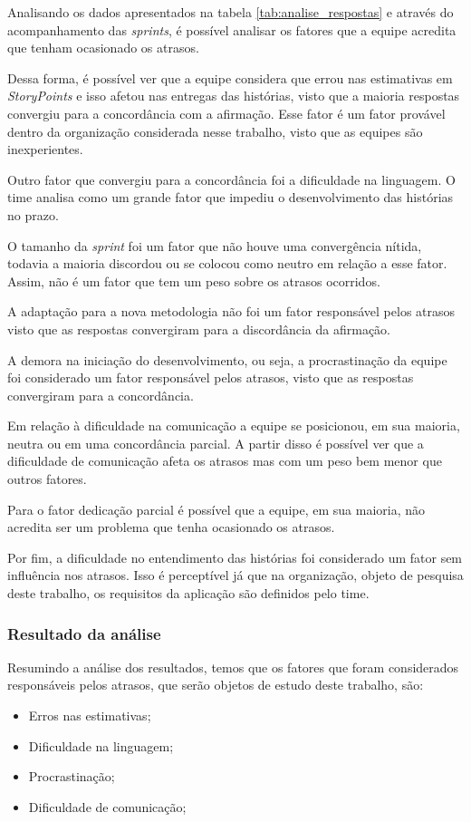 			Analisando os dados apresentados na tabela \ref{tab:analise_respostas} e através do acompanhamento das \textit{sprints}, é possível analisar os fatores que a equipe acredita que tenham ocasionado os atrasos.
	
			Dessa forma, é possível ver que a equipe considera que errou nas estimativas em \textit{StoryPoints} e isso afetou nas entregas das histórias, visto que a maioria respostas convergiu para a concordância com a afirmação. Esse fator é um fator provável dentro da organização considerada nesse trabalho, visto que as equipes são inexperientes.

			Outro fator que convergiu para a concordância foi a dificuldade na linguagem. O time analisa como um grande fator que impediu o desenvolvimento das histórias no prazo.

			O tamanho da \textit{sprint} foi um fator que não houve uma convergência nítida, todavia a maioria discordou ou se colocou como neutro em relação a esse fator. Assim, não é um fator que tem um peso sobre os atrasos ocorridos.

			A adaptação para a nova metodologia não foi um fator responsável pelos atrasos visto que as respostas convergiram para a discordância da afirmação.

			A demora na iniciação do desenvolvimento, ou seja, a procrastinação da equipe foi considerado um fator responsável pelos atrasos, visto que as respostas convergiram para a concordância.

			Em relação à dificuldade na comunicação a equipe se posicionou, em sua maioria, neutra ou em uma concordância parcial. A partir disso é possível
			ver que a dificuldade de comunicação afeta os atrasos mas com um peso bem menor que outros fatores.

			Para o fator dedicação parcial é possível que a equipe, em sua maioria, não acredita ser um problema que tenha ocasionado os atrasos.

			Por fim, a dificuldade no entendimento das histórias foi considerado um fator sem influência nos atrasos. Isso é perceptível já que na organização, objeto de pesquisa deste trabalho, os requisitos da aplicação são definidos pelo time.

		\subsubsection{Resultado da análise}
			Resumindo a análise dos resultados, temos que os fatores que foram considerados responsáveis pelos atrasos, que serão objetos de estudo deste trabalho, são:

			\begin{itemize}
				\item Erros nas estimativas;
				\item Dificuldade na linguagem;
				\item Procrastinação;
				\item Dificuldade de comunicação;
			\end{itemize}
